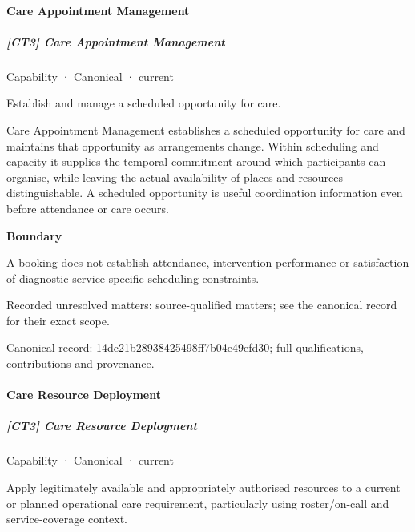 \paragraph{Care Appointment Management}

\subparagraph{[CT3] Care Appointment Management}

\label{element:14dc21b28938425498ff7b04e49efd30}
{\small Capability · Canonical · current}\par

Establish and manage a scheduled opportunity for care.



Care Appointment Management establishes a scheduled opportunity for care and maintains that opportunity as arrangements change. Within scheduling and capacity it supplies the temporal commitment around which participants can organise, while leaving the actual availability of places and resources distinguishable. A scheduled opportunity is useful coordination information even before attendance or care occurs.



\textbf{Boundary}



A booking does not establish attendance, intervention performance or satisfaction of diagnostic-service-specific scheduling constraints.


{\small Recorded unresolved matters: source-qualified matters; see the canonical record for their exact scope.}\par
{\footnotesize \href{../../../../continuum/strategy/capability/14dc21b28938425498ff7b04e49efd30.md}{Canonical record: 14dc21b28938425498ff7b04e49efd30}; full qualifications, contributions and provenance.}\par
\paragraph{Care Resource Deployment}

\subparagraph{[CT3] Care Resource Deployment}

\label{element:7854224c3b064116b0d48f01ce5537d8}
{\small Capability · Canonical · current}\par

Apply legitimately available and appropriately authorised resources to a current or planned operational care requirement, particularly using roster/on-call and service-coverage context.




